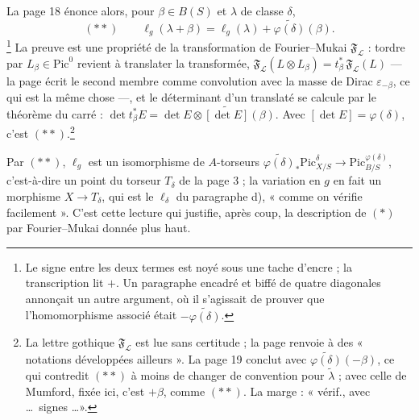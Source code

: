 \documentclass[11pt,a4paper]{article}
\begin{document}
La page 18 énonce alors, pour $\beta \in B(S)$ et $\lambda$ de classe $\delta$,
\[
(**) \qquad \ell_g(\lambda + \beta) = \ell_g(\lambda) + \widetilde{\varphi(\delta)}(\beta).
\]
\footnote{Le signe entre les deux termes est noyé sous une tache d'encre ; la
transcription lit $+$. Un paragraphe encadré et biffé de quatre diagonales
annonçait un autre argument, où il s'agissait de prouver que l'homomorphisme
associé était $-\widetilde{\varphi(\delta)}$.} La preuve est une propriété de
la transformation de Fourier--Mukai $\mathfrak{F}_{\mathcal{L}}$ : tordre par
$L_{\beta} \in \mathrm{Pic}^{0}$ revient à translater la transformée,
$\mathfrak{F}_{\mathcal{L}}(L \otimes L_{\beta}) =
t_{\beta}^{*}\,\mathfrak{F}_{\mathcal{L}}(L)$ — la page écrit le second membre
comme convolution avec la masse de Dirac $\varepsilon_{-\beta}$, ce qui est la
même chose —, et le déterminant d'un translaté se calcule par le théorème du
carré : $\det t_{\beta}^{*}E = \det E \otimes \widetilde{[\det E]}(\beta)$. Avec
$[\det E] = \varphi(\delta)$, c'est $(**)$.\footnote{La lettre gothique
$\mathfrak{F}_{\mathcal{L}}$ est lue sans certitude ; la page renvoie à des
« notations développées ailleurs ». La page 19 conclut avec
$\widetilde{\varphi(\delta)}(-\beta)$, ce qui contredit $(**)$ à moins de
changer de convention pour $\tilde{\lambda}$ ; avec celle de Mumford, fixée
ici, c'est $+\beta$, comme $(**)$. La marge : « vérif., avec \ldots\ signes
\ldots ».}

Par $(**)$, $\ell_g$ est un isomorphisme de $A$-torseurs
$\widetilde{\varphi(\delta)}_{*}\mathrm{Pic}^{\delta}_{X/S} \to
\mathrm{Pic}^{\varphi(\delta)}_{B/S}$, c'est-à-dire un point du torseur
$T_{\delta}$ de la page 3 ; la variation en $g$ en fait un morphisme
$X \to T_{\delta}$, qui est le $\ell_{\delta}$ du paragraphe d), « comme on
vérifie facilement ». C'est cette lecture qui justifie, après coup, la
description de $(*)$ par Fourier--Mukai donnée plus haut.
\end{document}
